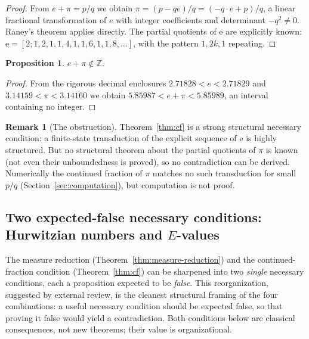 \documentclass[11pt]{amsart}
\newtheorem{proposition}[theorem]{Proposition}
\theoremstyle{definition}
\newtheorem{remark}[theorem]{Remark}
\theoremstyle{remark}
\numberwithin{equation}{section}
\newcommand{\Z}{\mathbb{Z}}
\newcommand{\ee}{\mathrm{e}}
\begin{document}
\begin{proof}
From $e+\pi=p/q$ we obtain $\pi=(p-qe)/q=(-q\cdot e+p)/q$, a linear fractional transformation of $e$ with integer coefficients and determinant $-q^2\ne0$. Raney's theorem applies directly. The partial quotients of $\ee$ are explicitly known: $\ee=[2;1,2,1,1,4,1,1,6,1,1,8,\dots]$, with the pattern $1,2k,1$ repeating.
\end{proof}

\begin{proposition}\label{prop:not-integer}
$e+\pi\notin\Z$.
\end{proposition}

\begin{proof}
From the rigorous decimal enclosures $2.71828<e<2.71829$ and $3.14159<\pi<3.14160$ we obtain $5.85987<e+\pi<5.85989$, an interval containing no integer.
\end{proof}

\begin{remark}[The obstruction]
Theorem~\ref{thm:cf} is a strong structural necessary condition: a finite-state transduction of the explicit sequence of $\ee$ is highly structured. But no structural theorem about the partial quotients of $\pi$ is known (not even their unboundedness is proved), so no contradiction can be derived. Numerically the continued fraction of $\pi$ matches no such transduction for small $p/q$ (Section~\ref{sec:computation}), but computation is not proof.
\end{remark}

\subsection{Two expected-false necessary conditions: Hurwitzian numbers and \texorpdfstring{$E$}{E}-values}\label{sec:expected-false}

The measure reduction (Theorem~\ref{thm:measure-reduction}) and the continued-fraction condition (Theorem~\ref{thm:cf}) can be sharpened into two \emph{single} necessary conditions, each a proposition expected to be \emph{false}. This reorganization, suggested by external review, is the cleanest structural framing of the four combinations: a useful necessary condition should be expected false, so that proving it false would yield a contradiction. Both conditions below are classical consequences, not new theorems; their value is organizational.
\end{document}
